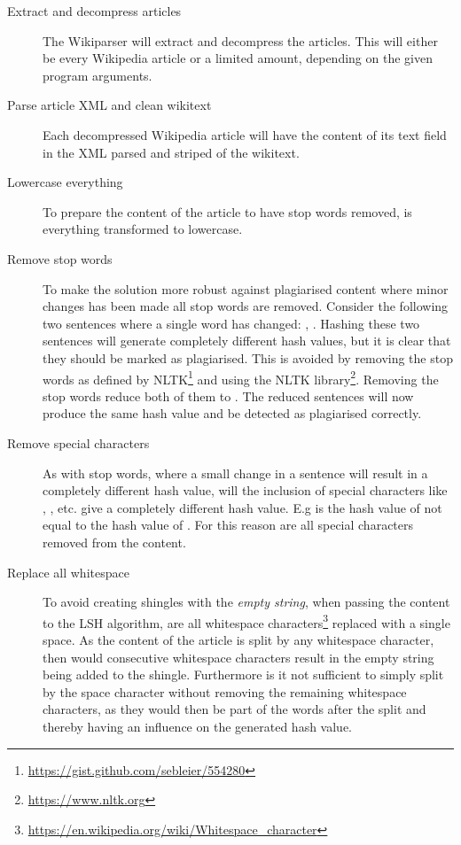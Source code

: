 \begin{description}
    \item[Extract and decompress articles] The Wikiparser will extract and decompress the articles. This will either be every Wikipedia article or a limited amount, depending on the given program arguments.
    \item[Parse article XML and clean wikitext] Each decompressed Wikipedia article will have the content of its text field in the XML parsed and striped of the wikitext.
    \item[Lowercase everything] To prepare the content of the article to have stop words removed, is everything transformed to lowercase.
    \item[Remove stop words] To make the solution more robust against plagiarised content where minor changes has been made all stop words are removed. Consider the following two sentences where a single word has changed: , . Hashing these two sentences will generate completely different hash values, but it is clear that they should be marked as plagiarised. This is avoided by removing the stop words as defined by NLTK\footnote{\url{https://gist.github.com/sebleier/554280}} and using the NLTK library\footnote{\url{https://www.nltk.org}}. Removing the stop words reduce both of them to . The reduced sentences will now produce the same hash value and be detected as plagiarised correctly.
    \item[Remove special characters] As with stop words, where a small change in a sentence will result in a completely different hash value, will the inclusion of special characters like , \say{,}, \say{;} etc. give a completely different hash value. E.g is the hash value of  not equal to the hash value of . For this reason are all special characters removed from the content.
    \item[Replace all whitespace] To avoid creating shingles with the \emph{empty string}, when passing the content to the LSH algorithm, are all whitespace characters\footnote{\url{https://en.wikipedia.org/wiki/Whitespace_character}} replaced with a single space. As the content of the article is split by any whitespace character, then would consecutive whitespace characters result in the empty string being added to the shingle. Furthermore is it not sufficient to simply split by the space character without removing the remaining whitespace characters, as they would then be part of the words after the split and thereby having an influence on the generated hash value.

\end{description}
